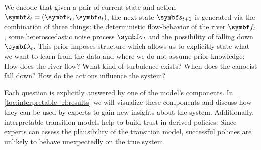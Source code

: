 We encode that given a pair of current state and action $\mat{\hat{s}}_t = \left( \mat{s}_t, \mat{a}_t \right)$, the next state $\mat{s}_{t+1}$ is generated via the combination of three things:
the deterministic flow-behavior of the river $\mat{f}_t$, some heteroscedastic noise process $\mat{\sigma}_t$ and the possibility of falling down $\mat{\lambda}_t$.
This prior imposes structure which allows us to explicitly state what we want to learn from the data and where we do not assume prior knowledge:
How does the river flow?
What kind of turbulence exists?
When does the canoeist fall down?
How do the actions influence the system?

Each question is explicitly answered by one of the model's components.
In \cref{toc:interpretable_rl:results} we will visualize these components and discuss how they can be used by experts to gain new insights about the system.
Additionally, interpretable transition models help to build trust in derived policies:
Since experts can assess the plausibility of the transition model, successful policies are unlikely to behave unexpectedly on the true system.

